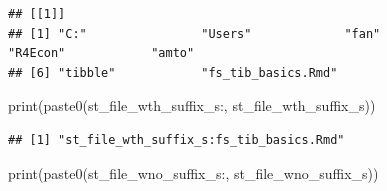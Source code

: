 \documentclass[
]{book}
\newenvironment{Shaded}{\begin{snugshade}}{\end{snugshade}}
\newcommand{\AttributeTok}[1]{\textcolor[rgb]{0.77,0.63,0.00}{#1}}
\newcommand{\DecValTok}[1]{\textcolor[rgb]{0.00,0.00,0.81}{#1}}
\newcommand{\FunctionTok}[1]{\textcolor[rgb]{0.00,0.00,0.00}{#1}}
\newcommand{\NormalTok}[1]{#1}
\newcommand{\OtherTok}[1]{\textcolor[rgb]{0.56,0.35,0.01}{#1}}
\newcommand{\SpecialCharTok}[1]{\textcolor[rgb]{0.00,0.00,0.00}{#1}}
\newcommand{\StringTok}[1]{\textcolor[rgb]{0.31,0.60,0.02}{#1}}
\begin{document}
\begin{Shaded}
\end{Shaded}

\begin{verbatim}
## [[1]]
## [1] "C:"                "Users"             "fan"               "R4Econ"            "amto"             
## [6] "tibble"            "fs_tib_basics.Rmd"
\end{verbatim}

\begin{Shaded}
\begin{Highlighting}[]
\FunctionTok{print}\NormalTok{(}\FunctionTok{paste0}\NormalTok{(}\StringTok{\textquotesingle{}st\_file\_wth\_suffix\_s:\textquotesingle{}}\NormalTok{, st\_file\_wth\_suffix\_s))}
\end{Highlighting}
\end{Shaded}

\begin{verbatim}
## [1] "st_file_wth_suffix_s:fs_tib_basics.Rmd"
\end{verbatim}

\begin{Shaded}
\begin{Highlighting}[]
\FunctionTok{print}\NormalTok{(}\FunctionTok{paste0}\NormalTok{(}\StringTok{\textquotesingle{}st\_file\_wno\_suffix\_s:\textquotesingle{}}\NormalTok{, st\_file\_wno\_suffix\_s))}
\end{Highlighting}
\end{Shaded}
\end{document}
